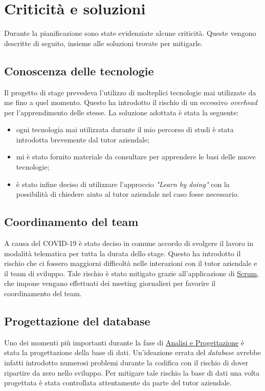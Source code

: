 \section{Criticità e soluzioni}
Durante la pianificazione sono state evidenziate alcune criticità. Queste vengono descritte di seguito, insieme alle soluzioni trovate per mitigarle.

\subsection*{Conoscenza delle tecnologie}
Il progetto di stage prevedeva l'utilizzo di molteplici tecnologie mai utilizzate da me fino a quel momento. Questo ha introdotto il rischio di un eccessivo \textit{overhead} per l'apprendimento delle stesse. La soluzione adottata è stata la seguente:
\begin{itemize}
    \item ogni tecnologia mai utilizzata durante il mio percorso di studi è stata introdotta brevemente dal tutor aziendale;
    \item mi è stato fornito materiale da consultare per apprendere le basi delle nuove tecnologie;
    \item è stato infine deciso di utilizzare l'approccio \textit{"Learn by doing"} con la possibilità di chiedere aiuto al tutor aziendale nel caso fosse necessario.
\end{itemize} 

\subsection*{Coordinamento del team}
A causa del COVID-19 è stato deciso in comune accordo di svolgere il lavoro in modalità telematica per tutta la durata dello stage. Questo ha introdotto il rischio che ci fossero maggiorni difficoltà nelle interazioni con il tutor aziendale e il team di sviluppo. Tale rischio è stato mitigato grazie all'applicazione di \hyperref[sez:scrum]{Scrum}, che impone vengano effettuati dei meeting giornalieri per favorire il coordinamento del team.

\subsection*{Progettazione del database}
Uno dei momenti più importanti durante la fase di \hyperref[cap:analisi]{Analisi e Progettazione} è stata la progettazione della base di dati. Un'ideazione errata del \textit{database} avrebbe infatti introdotto numerosi problemi durante la codifica con il rischio di dover ripartire da zero nello sviluppo. Per mitigare tale rischio la base di dati una volta progettata è stata controllata attentamente da parte del tutor aziendale.

